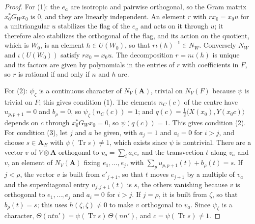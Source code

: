 \begin{proof}
For (1): the $e_a$ are isotropic and pairwise orthogonal, so the Gram matrix
$x_0^*G_Wx_0$ is $0$, and they are linearly independent. An element $r$ with
$rx_0=x_0u$ for a unitriangular $u$ stabilizes the flag of the $e_a$ and acts on
it through $u$; it therefore also stabilizes the orthogonal of the flag, and
its action on the quotient, which is $W_0$, is an element $h\in U(W_0)$, so that
$r\iota(h)^{-1}\in N_W$. Conversely $N_W$ and $\iota(U(W_0))$ satisfy
$rx_0=x_0u$. The decomposition $r=n\iota(h)$ is unique and its factors are given
by polynomials in the entries of $r$ with coefficients in $F$, so $r$ is
rational if and only if $n$ and $h$ are.

For (2): $\psi_\zeta$ is a continuous character of $N_V(\mathbf A)$, trivial
on $N_V(F)$ because $\psi$ is trivial on $F$; this gives condition (1). The
elements $n_C(c)$ of the centre have $u_{p,p+1}=0$ and $b_\rho=0$, so
$\psi_\zeta(n_C(c))=1$; and $q(c)=\frac12\langle X(x_0),Y(x_0c)\rangle$ depends on
$c$ through $x_0^*G_Wx_0=0$, so $\psi(q(c))=1$. This gives condition (2). For
condition (3), let $j$ and $a$ be given, with $a_j=1$ and $a_i=0$ for $i>j$, and
choose $s\in\mathbf A_E$ with $\psi(\operatorname{Tr}s)\neq1$, which exists since
$\psi$ is nontrivial. There are a vector $v$ of $V\otimes\mathbf A$ orthogonal to
$v_a=\sum_ia_ie_i$ and the transvection $t$ along $v_a$ and $v$, an element of
$N_V(\mathbf A)$ fixing $e_1,\ldots,e_j$, with
$\sum_pu_{p,p+1}(t)+b_\rho(t)=s$. If $j<\rho$, the vector $v$ is built from
$e'_{j+1}$, so that $t$ moves $e_{j+1}$ by a multiple of $v_a$ and the
superdiagonal entry $u_{j,j+1}(t)$ is $s$, the others vanishing because $v$ is
orthogonal to $e_1,\ldots,e_j$ and $a_i=0$ for $i>j$. If $j=\rho$, it is built
from $\zeta$, so that $b_\rho(t)=s$; this uses $h(\zeta,\zeta)\neq0$ to make $v$
orthogonal to $v_a$. Since $\psi_\zeta$ is a
character, $\Theta(ntn')=\overline{\psi(\operatorname{Tr}s)}\,\Theta(nn')$, and
$c=\overline{\psi(\operatorname{Tr}s)}\neq1$.


\end{proof}
